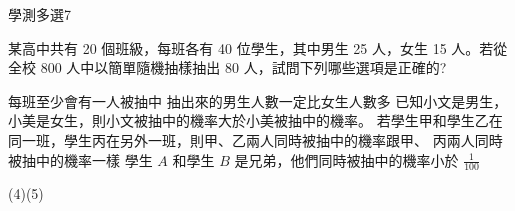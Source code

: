     \begin{QUESTION}
        \begin{ExamInfo}{97}{學測}{多選}{7}
        \end{ExamInfo}
        \begin{ExamAnsRateInfo}{39}{60}{40}{17}
        \end{ExamAnsRateInfo}
        \begin{QBODY}
            某高中共有 20 個班級，每班各有 40 位學生，其中男生 25 人，女生 15 人。若從全校 800 人中以簡單隨機抽樣抽出 80 人，試問下列哪些選項是正確的? 
			\begin{QOPS} 
				\QOP 每班至少會有一人被抽中 
				\QOP 抽出來的男生人數一定比女生人數多 
				\QOP 已知小文是男生，小美是女生，則小文被抽中的機率大於小美被抽中的機率。 
				\QOP 若學生甲和學生乙在同一班，學生丙在另外一班，則甲、乙兩人同時被抽中的機率跟甲、 丙兩人同時被抽中的機率一樣 
				\QOP 學生 $A$ 和學生 $B$ 是兄弟，他們同時被抽中的機率小於 $\frac{1}{100}$
            \end{QOPS}
        \end{QBODY}
        \begin{QFROMS}
        \end{QFROMS}
        \begin{QTAGS}\end{QTAGS}
        \begin{QANS}
            (4)(5)
        \end{QANS}
        \begin{QSOLLIST}
        \end{QSOLLIST}
        \begin{QEMPTYSPACE}
        \end{QEMPTYSPACE}
    \end{QUESTION}
